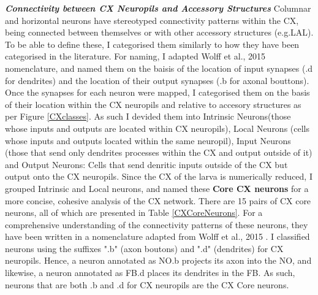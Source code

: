     \textbf{\textit{Connectivity between CX Neuropils and Accessory Structures}}
    Columnar and horizontal neurons have stereotyped connectivity patterns within the CX, being connected between themselves or with other accessory structures (e.g.LAL). To be able to define these, I categorised them similarly to how they have been categorised in the literature. For naming, I adapted Wolff et al., 2015 nomenclature, and named them on the baisis of the location of input synapses (.d for dendrites) and the location of their output synapses (.b for axonal bouttons). Once the synapses for each neuron were mapped, I categorised them on the basis of their location within the CX neuropils and relative to accesory structures as per Figure \ref{CXclasses}.  As such I devided them into Intrinsic Neurons(those whose inputs and outputs are located within CX neuropils), Local Neurons (cells whose inputs and outputs located within the same neuropil), Input Neurons (those that send only dendrites processes within the CX and output outside of it) and Output Neurons: Cells that send denritic inputs outside of the CX but output onto the CX neuropils. Since the CX of the larva is numerically reduced, I grouped Intrinsic and Local neurons, and named these \textbf{Core CX neurons} for a more concise, cohesive analysis of the CX network. There are 15 pairs of CX core neurons, all of which are presented in Table \ref{CXCoreNeurons}. For a comprehensive understanding of the connectivity patterns of these neurons, they have been written in a nomenclature adapted from Wolff et al., 2015 \citep{wolff2015neuroarchitecture}. I classified neurons using the suffixes ".b" (axon boutons) and ".d" (dendrites) for CX neuropils.
    Hence, a neuron annotated as NO.b projects its axon into the NO, and likewise, a neuron annotated as FB.d places its dendrites in the FB.
    As such, neurons that are both .b and .d for CX neuropils are the CX Core neurons. 
